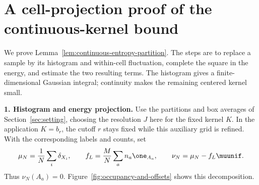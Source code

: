 \appendix
\section{A cell-projection proof of the continuous-kernel bound}
\label{app:continuous-proof}
We prove Lemma~\ref{lem:continuous-entropy-partition}.  The steps are to replace a sample by its histogram and within-cell fluctuation, complete the square in the energy, and estimate the two resulting terms.  The histogram gives a finite-dimensional Gaussian integral; continuity makes the remaining centered kernel small.

\textbf{1. Histogram and energy projection.}
Use the partitions and box averages of Section~\ref{sec:setting}, choosing the resolution $J$ here for the fixed kernel $K$.  In the application $K=b_r$, the cutoff $r$ stays fixed while this auxiliary grid is refined.  With the corresponding labels and counts, set
\begin{equation}
 \mu_N=\frac1N\sum_i\delta_{X_i},\qquad
 f_L=\frac MN\sum_a n_a\one_{A_a},\qquad
 \nu_N=\mu_N-f_L\muunif.
 \label{eq:empirical-histogram-splitting}
\end{equation}
Thus $\nu_N(A_a)=0$.  Figure~\ref{fig:occupancy-and-offsets} shows this decomposition.

